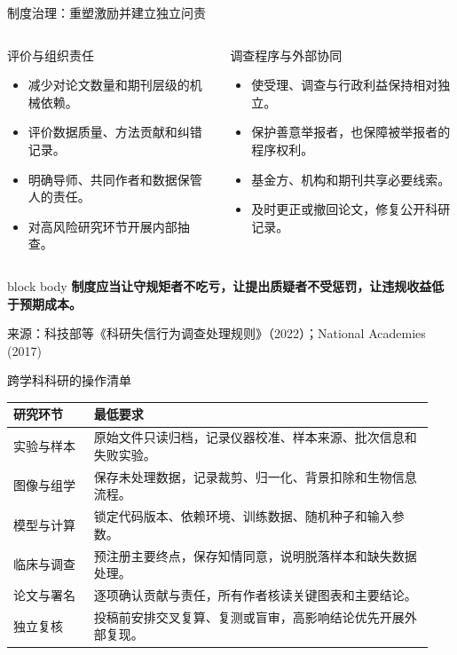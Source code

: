 \documentclass[aspectratio=169,10pt]{ctexbeamer}
\newcommand{\source}[1]{%
  \par\vfill\begingroup\color{Muted}\fontsize{5.8}{7}\selectfont 来源：#1\endgroup
}
\newcommand{\takeaway}[1]{%
  \begin{beamercolorbox}[rounded=true,sep=0.65em,wd=\linewidth]{block body}
    \centering\color{MutedBlue}\textbf{#1}
  \end{beamercolorbox}
}
\begin{document}
\begin{frame}{制度治理：重塑激励并建立独立问责}
  \begin{columns}[T,onlytextwidth]
      \begin{block}{评价与组织责任}
        \begin{itemize}
          \item 减少对论文数量和期刊层级的机械依赖。
          \item 评价数据质量、方法贡献和纠错记录。
          \item 明确导师、共同作者和数据保管人的责任。
          \item 对高风险研究环节开展内部抽查。
        \end{itemize}
      \end{block}
      \begin{block}{调查程序与外部协同}
        \begin{itemize}
          \item 使受理、调查与行政利益保持相对独立。
          \item 保护善意举报者，也保障被举报者的程序权利。
          \item 基金方、机构和期刊共享必要线索。
          \item 及时更正或撤回论文，修复公开科研记录。
        \end{itemize}
      \end{block}
  \end{columns}

  \vspace{0.25cm}
  \takeaway{制度应当让守规矩者不吃亏，让提出质疑者不受惩罚，让违规收益低于预期成本。}
  \source{科技部等《科研失信行为调查处理规则》（2022）；National Academies (2017)}
\end{frame}

\begin{frame}{跨学科科研的操作清单}
  \small
  \begin{tabular}{@{}p{0.18\linewidth}p{0.76\linewidth}@{}}
    \toprule
    \textbf{研究环节} & \textbf{最低要求} \\
    \midrule
    实验与样本 & 原始文件只读归档，记录仪器校准、样本来源、批次信息和失败实验。\\
    \addlinespace
    图像与组学 & 保存未处理数据，记录裁剪、归一化、背景扣除和生物信息流程。\\
    \addlinespace
    模型与计算 & 锁定代码版本、依赖环境、训练数据、随机种子和输入参数。\\
    \addlinespace
    临床与调查 & 预注册主要终点，保存知情同意，说明脱落样本和缺失数据处理。\\
    \addlinespace
    论文与署名 & 逐项确认贡献与责任，所有作者核读关键图表和主要结论。\\
    \addlinespace
    独立复核 & 投稿前安排交叉复算、复测或盲审，高影响结论优先开展外部复现。\\
    \bottomrule
  \end{tabular}
\end{frame}
\end{document}
